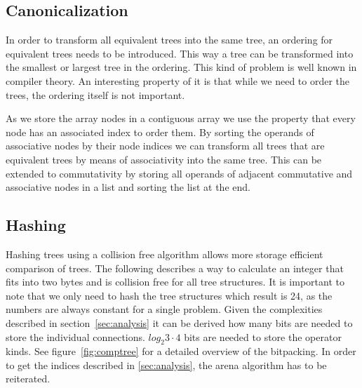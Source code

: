 \documentclass[11pt,a4paper]{article}
\begin{document}
\subsection{Canonicalization}

In order to transform all equivalent trees into the same tree, an
ordering for equivalent trees needs to be introduced.
This way a tree can be transformed into the smallest or largest tree
in the ordering.
This kind of problem is well known in compiler theory.
An interesting property of it is that while we need to order the
trees, the ordering itself is not important.

As we store the array nodes in a contiguous array we use the property
that every node has an associated index to order them.
By sorting the operands of associative nodes by their node indices we
can transform all trees that are equivalent trees by means of
associativity into the same tree.
This can be extended to commutativity by storing all operands of
adjacent commutative and associative nodes in a list and sorting the
list at the end.

\subsection{Hashing}

Hashing trees using a collision free algorithm allows more storage
efficient comparison of trees.
The following describes a way to calculate an integer that fits into
two bytes and is collision free for all tree structures.
It is important to note that we only need to hash the tree structures
which result is 24, as the numbers are always constant for a single
problem.
Given the complexities described in section~\ref{sec:analysis} it can
be derived how many bits are needed to store the individual
connections.
$log_2{3 \cdot 4}$ bits are needed to store the operator kinds.
See figure~\ref{fig:comptree} for a detailed overview of the
bitpacking.
In order to get the indices described in \ref{sec:analysis}, the arena
algorithm has to be reiterated.


\end{document}
